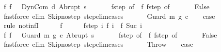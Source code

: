\begin{isabellebody}
\ f{\isacharunderscore}{}{\isacharcolon}\ {\isachardoublequoteopen}f\ {}\ {\isacharequal}\ {\isacharparenleft}DynCom\ d{\isacharcomma}\ Abrupt\ s{\isacharparenright}{\isachardoublequoteclose}\ \isanewline
\ \ \ \ \isamarkupfalse%
\ f{\isacharunderscore}step\ {\isacharbrackleft}of\ {}{\isacharbrackright}\ f{\isacharunderscore}{}\ f{\isacharunderscore}step\ {\isacharbrackleft}of\ {}{\isacharbrackright}\isanewline
\ \ \ \ \isamarkupfalse%
\ False\isanewline
\ \ \ \ \ \ \isamarkupfalse%
\ {\isacharparenleft}fastforce\ elim{\isacharcolon}\ Skip{\isacharunderscore}no{\isacharunderscore}step\ step{\isacharunderscore}elim{\isacharunderscore}cases{\isacharparenright}\isanewline
\ \ \isamarkupfalse%
\isanewline
{}\isamarkupfalse%
\isanewline
\ \ \isamarkupfalse%
\ {\isacharparenleft}Guard\ m\ g\ c{\isacharparenright}\isanewline
\ \ \isamarkupfalse%
\ {\isacharquery}case\ \isanewline
\ \ \isamarkupfalse%
\ {\isacharparenleft}rule\ not{\isacharunderscore}infI{\isacharparenright}\isanewline
\ \ \ \ \isamarkupfalse%
\ f\isanewline
\ \ \ \ \isamarkupfalse%
\ f{\isacharunderscore}step{\isacharcolon}\ {\isachardoublequoteopen}{\isasymAnd}i{\isachardot}\ {\isasymGamma}{\isasymturnstile}f\ i\ {\isasymrightarrow}\ f\ {\isacharparenleft}Suc\ i{\isacharparenright}{\isachardoublequoteclose}\isanewline
\ \ \ \ \isamarkupfalse%
\ f{\isacharunderscore}{}{\isacharcolon}\ {\isachardoublequoteopen}f\ {}\ {\isacharequal}\ {\isacharparenleft}Guard\ m\ g\ c{\isacharcomma}\ Abrupt\ s{\isacharparenright}{\isachardoublequoteclose}\ \isanewline
\ \ \ \ \isamarkupfalse%
\ f{\isacharunderscore}step\ {\isacharbrackleft}of\ {}{\isacharbrackright}\ f{\isacharunderscore}{}\ f{\isacharunderscore}step\ {\isacharbrackleft}of\ {}{\isacharbrackright}\isanewline
\ \ \ \ \isamarkupfalse%
\ False\isanewline
\ \ \ \ \ \ \isamarkupfalse%
\ {\isacharparenleft}fastforce\ elim{\isacharcolon}\ Skip{\isacharunderscore}no{\isacharunderscore}step\ step{\isacharunderscore}elim{\isacharunderscore}cases{\isacharparenright}\isanewline
\ \ \isamarkupfalse%
\isanewline
{}\isamarkupfalse%
\isanewline
\ \ \isamarkupfalse%
\ Throw\isanewline
\ \ \isamarkupfalse%
\ {\isacharquery}case\ \isanewline
\ \ \isamarkupfalse%

\end{isabellebody}
